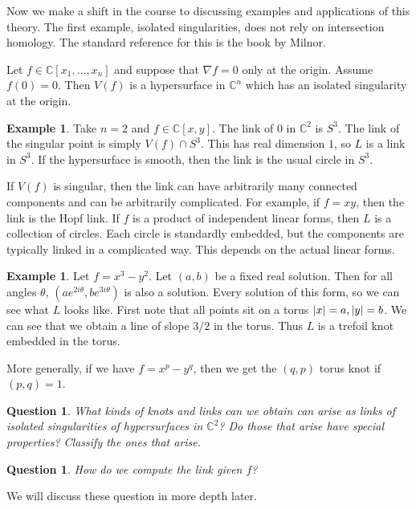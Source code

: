 \documentclass[leqno, openany]{memoir}
\newtheorem{quest}[thm]{Question}
\theoremstyle{definition}
\newtheorem{exm}[thm]{Example}
\theoremstyle{remark}
\theoremstyle{plain}
\theoremstyle{definition}
\theoremstyle{remark}
\newcommand{\C}{\mathbb{C}}
\begin{document}
Now we make a shift in the course to discussing examples and applications of
this theory. The first example, isolated singularities, does not rely on
intersection homology. The standard reference for this is the book by Milnor.

Let $f \in \C[x_1, \ldots, x_n]$ and suppose that $\nabla f = 0$ only at the
origin. Assume $f(0) = 0$. Then $V(f)$ is a hypersurface in $\C^n$ which has an
isolated singularity at the origin.

\begin{exm} Take $n = 2$ and $f \in \C[x,y]$. The link of $0$ in $\C^2$ is
    $S^3$. The link of the singular point is simply $V(f) \cap S^3$. This has
    real dimension $1$, so $L$ is a link in $S^3$. If the hypersurface is
    smooth, then the link is the usual circle in $S^3$.

    If $V(f)$ is singular, then the link can have arbitrarily many connected
components and can be arbitrarily complicated. For example, if $f = xy$, then
the link is the Hopf link. If $f$ is a product of independent linear forms,
then $L$ is a collection of circles. Each circle is standardly embedded, but
the components are typically linked in a complicated way. This depends on the
actual linear forms.  \end{exm}

\begin{exm} Let $f = x^3 - y^2$. Let $(a,b)$ be a fixed real solution. Then for
    all angles $\theta$, $(ae^{2i\theta}, be^{3i\theta})$ is also a solution.
    Every solution of this form, so we can see what $L$ looks like. First note
    that all points sit on a torus $\abs{x} = a, \abs{y} = b$. We can see that
    we obtain a line of slope $3/2$ in the torus. Thus $L$ is a trefoil knot
    embedded in the torus.

    More generally, if we have $f = x^p - y^q$, then we get the $(q,p)$ torus
knot if $(p,q) = 1$.  \end{exm}

\begin{quest} What kinds of knots and links can we obtain can arise as links of
isolated singularities of hypersurfaces in $\C^2$? Do those that arise have
special properties? Classify the ones that arise.  \end{quest}

\begin{quest} How do we compute the link given $f$?  \end{quest}

We will discuss these question in more depth later.
\end{document}
